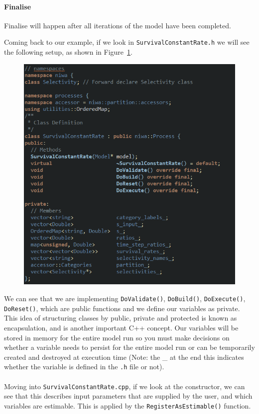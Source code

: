\paragraph*{Finalise}
Finalise will happen after all iterations of the model have been completed.
\pagebreak


Coming back to our example, if we look in \texttt{SurvivalConstantRate.h} we will {\color{red}see} the following setup, as shown in Figure~\ref{fig:process_h}.

\begin{figure}[!ht]
	\centering
	\includegraphics[scale=0.6]{Figures/process_h.png}
	\caption{}\label{fig:process_h}
\end{figure}

We can see that we are implementing \texttt{DoValidate()}, \texttt{DoBuild()}, \texttt{DoExecute()}, \texttt{DoReset()}, which are public functions and we define our variables as private. This idea of structuring classes by public, private and protected is known as encapsulation, and is another important C++ concept. Our variables will be stored in memory for the entire model run so you must make decisions on whether a variable needs to persist for the entire model run or can be temporarily created and destroyed at execution time (Note: the \_ at the end this indicates whether the variable is defined in the \texttt{.h} file or not). 
\\\\
Moving into \texttt{SurvivalConstantRate.cpp}, if we look at the constructor, we can see that this describes input parameters that are supplied by the user, and which variables are estimable. This is applied by the \texttt{RegisterAsEstimable()} function.

